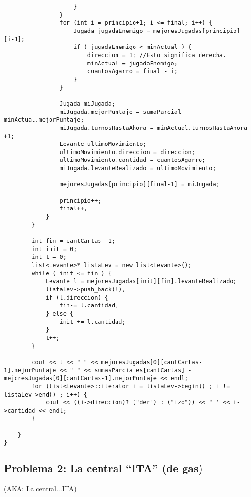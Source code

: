 \documentclass[11pt, a4paper, twoside]{article}
\begin{document}
\begin{lstlisting}
					}
				}
				for (int i = principio+1; i <= final; i++) {
					Jugada jugadaEnemigo = mejoresJugadas[principio][i-1];
					if ( jugadaEnemigo < minActual ) {
						direccion = 1; //Esto significa derecha.
						minActual = jugadaEnemigo;
						cuantosAgarro = final - i;
					}
				}

				Jugada miJugada;
				miJugada.mejorPuntaje = sumaParcial - minActual.mejorPuntaje;
				miJugada.turnosHastaAhora = minActual.turnosHastaAhora +1;
				Levante ultimoMovimiento;
				ultimoMovimiento.direccion = direccion;
				ultimoMovimiento.cantidad = cuantosAgarro;
				miJugada.levanteRealizado = ultimoMovimiento;
				
				mejoresJugadas[principio][final-1] = miJugada;

				principio++;
				final++;
			}
		}

		int fin = cantCartas -1;
		int init = 0;
		int t = 0;
		list<Levante>* listaLev = new list<Levante>();
		while ( init <= fin ) {
			Levante l = mejoresJugadas[init][fin].levanteRealizado;
			listaLev->push_back(l);
			if (l.direccion) {
				fin-= l.cantidad;
			} else {
				init += l.cantidad;
			}
			t++;
		}

		cout << t << " " << mejoresJugadas[0][cantCartas-1].mejorPuntaje << " " << sumasParciales[cantCartas] - mejoresJugadas[0][cantCartas-1].mejorPuntaje << endl;
		for (list<Levante>::iterator i = listaLev->begin() ; i != listaLev->end() ; i++) {
			cout << ((i->direccion)? ("der") : ("izq")) << " " << i->cantidad << endl;
		}

	}
}

\end{lstlisting}
\clearpage  
  
\subsection{Problema 2: La central ``ITA'' (de gas)}
  {\scriptsize(AKA: La central...ITA)}
   
\end{document}
